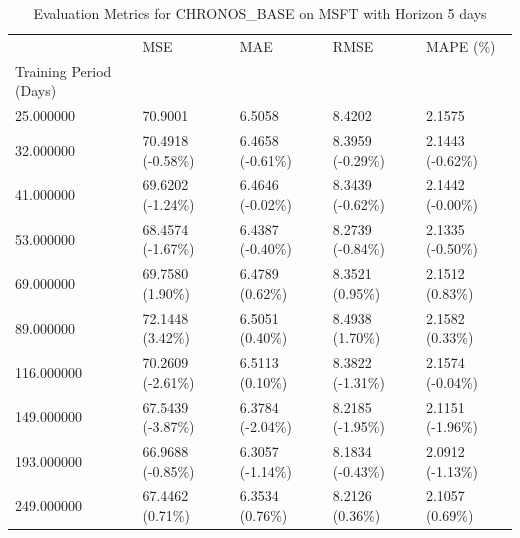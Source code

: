 \begin{table}
\caption{Evaluation Metrics for CHRONOS_BASE on MSFT with Horizon 5 days}
\label{tab:chronos_base_MSFT_h5_metrics}
\begin{tabular}{lllll}
\toprule
 & MSE & MAE & RMSE & MAPE (\%) \\
Training Period (Days) &  &  &  &  \\
\midrule
25.000000 & 70.9001 & 6.5058 & 8.4202 & 2.1575 \\
32.000000 & 70.4918 (-0.58\%) & 6.4658 (-0.61\%) & 8.3959 (-0.29\%) & 2.1443 (-0.62\%) \\
41.000000 & 69.6202 (-1.24\%) & 6.4646 (-0.02\%) & 8.3439 (-0.62\%) & 2.1442 (-0.00\%) \\
53.000000 & 68.4574 (-1.67\%) & 6.4387 (-0.40\%) & 8.2739 (-0.84\%) & 2.1335 (-0.50\%) \\
69.000000 & 69.7580 (1.90\%) & 6.4789 (0.62\%) & 8.3521 (0.95\%) & 2.1512 (0.83\%) \\
89.000000 & 72.1448 (3.42\%) & 6.5051 (0.40\%) & 8.4938 (1.70\%) & 2.1582 (0.33\%) \\
116.000000 & 70.2609 (-2.61\%) & 6.5113 (0.10\%) & 8.3822 (-1.31\%) & 2.1574 (-0.04\%) \\
149.000000 & 67.5439 (-3.87\%) & 6.3784 (-2.04\%) & 8.2185 (-1.95\%) & 2.1151 (-1.96\%) \\
193.000000 & 66.9688 (-0.85\%) & 6.3057 (-1.14\%) & 8.1834 (-0.43\%) & 2.0912 (-1.13\%) \\
249.000000 & 67.4462 (0.71\%) & 6.3534 (0.76\%) & 8.2126 (0.36\%) & 2.1057 (0.69\%) \\
\bottomrule
\end{tabular}
\end{table}
